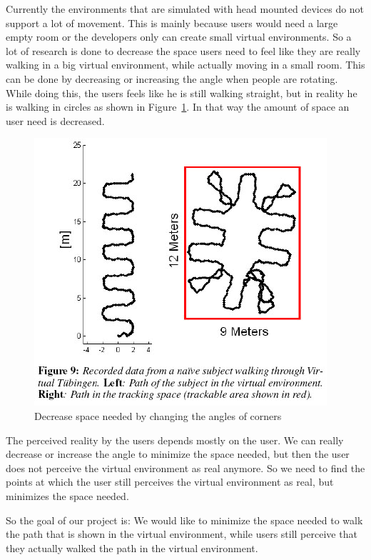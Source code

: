 Currently the environments that are simulated with head mounted devices do not support a lot of movement.
This is mainly because users would need a large empty room or the developers only can create small virtual environments.
So a lot of research is done to decrease the space users need to feel like they are really walking in a big virtual environment, while actually moving in a small room.
This can be done by decreasing or increasing the angle when people are rotating.
While doing this, the users feels like he is still walking straight, but in reality he is walking in circles as shown in Figure~\ref{figprob1}.
In that way the amount of space an user need is decreased.

\begin{figure}[ht!]
\centering
\includegraphics{sections/problem/figproblem1.jpg}
\caption{Decrease space needed by changing the angles of corners \label{figprob1}}
\end{figure}

The perceived reality by the users depends mostly on the user.
We can really decrease or increase the angle to minimize the space needed, but then the user does not perceive the virtual environment as real anymore.
So we need to find the points at which the user still perceives the virtual environment as real, but minimizes the space needed.

So the goal of our project is:
We would like to minimize the space needed to walk the path that is shown in the virtual environment, while users still perceive that they actually walked the path in the virtual environment.

